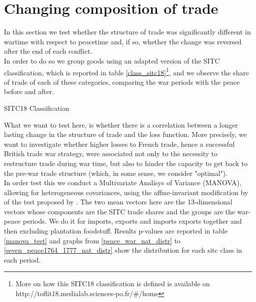 \documentclass[12pt,a4paper,notitlepage,english]{article}
\begin{document}
\section{Changing composition of trade}  \label{composition}
In this section we test whether the structure of trade was significantly different in wartime with respect to peacetime and, if so, whether the change was reversed after the end of each conflict. \\
In order to do so we group goods using an adapted version of the SITC classification, which is reported in table \ref{class_sitc18}\footnote{More on how this SITC18 classification is defined is available on http://toflit18.medialab.sciences-po.fr/\#/home}, and we observe the share of trade of each of these categories, comparing the war periods with the peace before and after. 
\begin{table}[H]
\centering
\caption{SITC18 Classification}
\label{class_sitc18}

\end{table}
What we want to test here, is whether there is a correlation between a longer lasting change in the structure of trade and the loss function. More precisely, we want to investigate whether higher losses to French trade, hence a successful British trade war strategy, were associated not only to the necessity to restructure trade during war time, but also to hinder the capacity to get back to the pre-war trade structure (which, in some sense, we consider "optimal"). \\
In order test this we conduct a Multivariate Analisys of Variance (MANOVA), allowing for heterogeneous covariances, using the affine-invariant modification by \cite{Krishnamoorthy2004} of the test proposed by \cite{Nel1986}. The two mean vectors here are the 13-dimensional vectors whose components are the SITC trade shares and the groups are the war-peace periods. 
We do it for imports, exports and imports exports together and then excluding plantation foodstuff. Results p-values are reported in table \ref{manova_test} and graphs from \ref{peace_war_nat_distr} to \ref{seven_peace1764_1777_nat_distr} show the distribution for each sitc class in each period.\\
\end{document}
